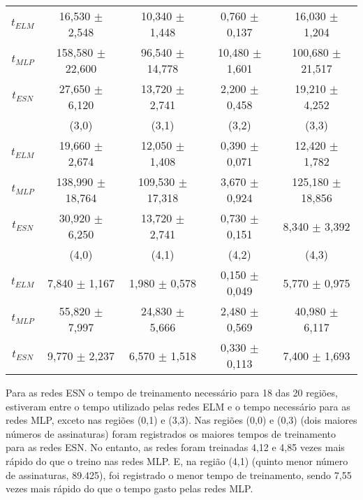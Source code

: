 \begin{table}[H]
\begin{small}
\begin{tabular}{*{5}{c}}
	$t_{ELM}$ &  16,530 $\pm$  2,548 &  10,340 $\pm$  1,448 &  0,760 $\pm$ 0,137 &  16,030 $\pm$  1,204 \\
	$t_{MLP}$ & 158,580 $\pm$ 22,600 &  96,540 $\pm$ 14,778 & 10,480 $\pm$ 1,601 & 100,680 $\pm$ 21,517 \\
	$t_{ESN}$ &  27,650 $\pm$  6,120 &  13,720 $\pm$  2,741 &  2,200 $\pm$ 0,458 &  19,210 $\pm$  4,252 \\ \midrule \midrule
		      &          (3,0)       &        (3,1)         &        (3,2)        &      (3,3)          \\ \cmidrule(lr){2-2}\cmidrule(lr){3-3}\cmidrule(lr){4-4}\cmidrule(lr){5-5}	
	$t_{ELM}$ &  19,660 $\pm$  2,674 &  12,050 $\pm$  1,408 &  0,390 $\pm$ 0,071 &  12,420 $\pm$  1,782 \\
	$t_{MLP}$ & 138,990 $\pm$ 18,764 & 109,530 $\pm$ 17,318 &  3,670 $\pm$ 0,924 & 125,180 $\pm$ 18,856 \\
	$t_{ESN}$ &  30,920 $\pm$  6,250 &  13,720 $\pm$  2,741 &  0,730 $\pm$ 0,151 &   8,340 $\pm$  3,392 \\ \midrule \midrule
		      &          (4,0)       &        (4,1)         &        (4,2)        &      (4,3)          \\ \cmidrule(lr){2-2}\cmidrule(lr){3-3}\cmidrule(lr){4-4}\cmidrule(lr){5-5}	
	$t_{ELM}$ &   7,840 $\pm$  1,167 &   1,980 $\pm$  0,578 &  0,150 $\pm$ 0,049 &  5,770 $\pm$  0,975 \\
	$t_{MLP}$ &  55,820 $\pm$  7,997 &  24,830 $\pm$  5,666 &  \cellcolor{gray!15}2,480 $\pm$ 0,569 & 40,980 $\pm$  6,117 \\
	$t_{ESN}$ &   9,770 $\pm$  2,237 &   6,570 $\pm$  1,518 &  0,330 $\pm$ 0,113 &  7,400 $\pm$  1,693 \\ \bottomrule
		\end{tabular}%
	\end{small}
\end{table}%

Para as redes ESN o tempo de treinamento necessário para 18 das 20 regiões, estiveram entre o tempo utilizado pelas redes ELM e o tempo necessário para as redes MLP, exceto nas regiões (0,1) e (3,3). Nas regiões (0,0) e (0,3) (dois  maiores números de assinaturas) foram registrados os maiores tempos de treinamento para as redes ESN. No entanto, as redes foram treinadas 4,12 e 4,85 vezes mais rápido do que o treino nas redes MLP. E, na região (4,1) (quinto menor número de assinaturas, 89.425), foi registrado o menor tempo de treinamento, sendo 7,55 vezes mais rápido do que o tempo gasto pelas redes MLP.


